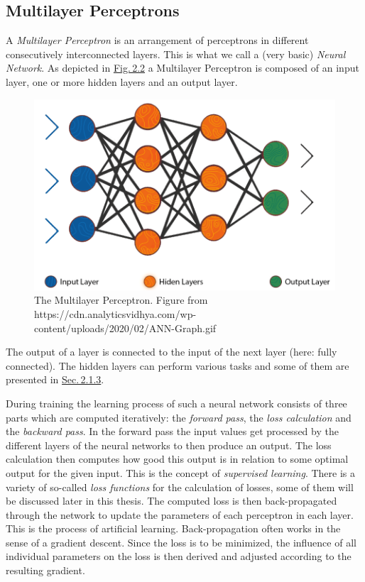 \subsection{Multilayer Perceptrons} \label{sec:2.1.2}
A \textit{Multilayer Perceptron} is an arrangement of perceptrons in different consecutively interconnected layers. This is what we call a (very basic) \textit{Neural Network}. As depicted in \hyperref[fig:2.2]{Fig.\,2.2} a Multilayer Perceptron is composed of an input layer, one or more hidden layers and an output layer. 
%
\begin{figure} \label{fig:2.2}
    \centering
    \includegraphics[width=.5\textwidth]{Chapters/figures/multilayer_perceptron.PNG}
    \caption[The Multilayer Perceptron]{The Multilayer Perceptron. Figure from\\ https://cdn.analyticsvidhya.com/wp-content/uploads/2020/02/ANN-Graph.gif}
\end{figure}
%
The output of a layer is connected to the input of the next layer (here: fully connected). The hidden layers can perform various tasks and some of them are presented in \hyperref[sec:2.1.3]{Sec.\,2.1.3}.

During training the learning process of such a neural network consists of three parts which are computed iteratively: the \textit{forward pass}, the \textit{loss calculation} and the \textit{backward pass}. In the forward pass the input values get processed by the different layers of the neural networks to then produce an output. The loss calculation then computes how good this output is in relation to some optimal output for the given input. This is the concept of \textit{supervised learning}. There is a variety of so-called \textit{loss functions} for the calculation of losses, some of them will be discussed later in this thesis. The computed loss is then back-propagated through the network to update the parameters of each perceptron in each layer. This is the process of artificial learning. Back-propagation often works in the sense of a gradient descent. Since the loss is to be minimized, the influence of all individual parameters on the loss is then derived and adjusted according to the resulting gradient. 

